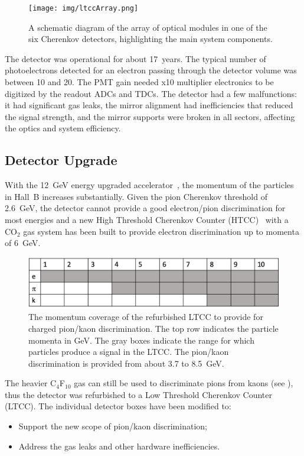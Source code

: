 \begin{figure}[ht]
	\centering
	\texttt{[image: img/ltccArray.png]}
	\caption{A schematic diagram of the array of optical modules in one of the six Cherenkov detectors, highlighting
          the main system components.}
	\label{fig:ltccArray}
\end{figure}

The detector was operational for about 17~years. The typical number of photoelectrons detected for an electron
passing through the detector volume was between 10 and 20. The PMT gain needed x10 multiplier electronics to be
digitized by the readout ADCs and TDCs. The detector had a few malfunctions: it had significant gas leaks, the
mirror alignment had inefficiencies that reduced the signal strength, and the mirror supports were broken in all
sectors, affecting the optics and system efficiency.

\subsection{Detector Upgrade}

With the 12~GeV energy upgraded accelerator~\cite{TDR12}, the momentum of the particles in Hall~B increases
substantially. Given the pion Cherenkov threshold of 2.6~GeV, the detector cannot provide a good electron/pion
discrimination for most energies and a new High Threshold Cherenkov Counter (HTCC)~\cite{htcc-nim} with a
CO$_2$ gas system has been built to provide electron discrimination up to momenta of 6~GeV.

\begin{figure}[h]
	\centering
	\includegraphics[width=0.99\columnwidth,keepaspectratio]{img/newScope.png}
	\caption{The momentum coverage of the refurbished LTCC to provide for charged pion/kaon discrimination.
          The top row indicates the particle momenta in GeV. The gray boxes indicate the range for which particles
          produce a signal in the LTCC. The pion/kaon discrimination is provided from about 3.7 to 8.5~GeV.}
	\label{fig:newScope}
\end{figure}

The heavier C$_4$F$_{10}$ gas can still be used to discriminate pions from kaons (see ), thus the
detector was refurbished to a Low Threshold Cherenkov Counter (LTCC). The individual detector boxes have
been modified to:

\begin{itemize}
	\item Support the new scope of pion/kaon discrimination;
	\item Address the gas leaks and other hardware inefficiencies.
\end{itemize}
